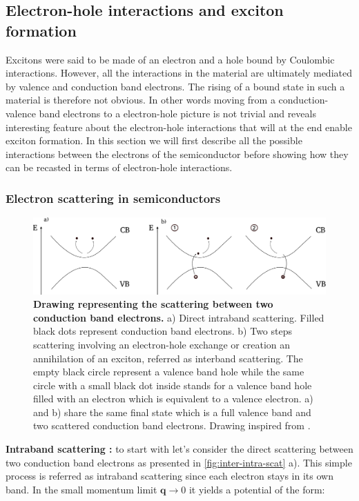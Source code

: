 \subsection{Electron-hole interactions and exciton formation}

Excitons were said to be made of an electron and a hole bound by Coulombic interactions. However, all the interactions in the material are ultimately mediated by valence and conduction band electrons. The rising
of a bound state in such a material is therefore not obvious. In other words moving from a conduction-valence band electrons to a electron-hole picture is not trivial and reveals interesting
feature about the electron-hole interactions that will at the end enable exciton formation. In this section we will first describe all the possible interactions between the electrons of the semiconductor before showing how they can be recasted in terms of electron-hole interactions.

\bigskip
\subsubsection{Electron scattering in semiconductors}
\begin{figure}[h]
    \centering
    \includegraphics[width=1\linewidth]{chap_theory/fig/intra-inter-band-processes.pdf}
    \caption{\textbf{Drawing representing the scattering between two conduction band electrons.} a) Direct intraband scattering. Filled black dots represent conduction band electrons. b) Two steps scattering involving an electron-hole exchange or creation an annihilation of an exciton, referred as interband scattering.
    The empty black circle represent a valence band hole while the same circle with a small black dot inside stands for a valence band hole filled with an electron which is equivalent to a valence electron. a) and b) share the same
     final state which is a full valence band and two scattered conduction band electrons. Drawing inspired from \cite{Combescot_cooper_excitons_2015}.}
    \label{fig:inter-intra-scat}
\end{figure}


\textbf{Intraband scattering :}
to start with let's consider the direct scattering between two conduction band electrons as presented in \autoref{fig:inter-intra-scat} a). This simple process is referred as intraband scattering since each electron stays in its own band. In the small momentum limit $\mathrm{\textbf{q}}\to 0$ it yields a potential of the form:

